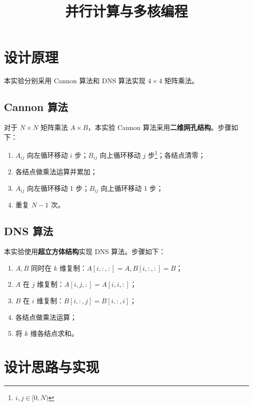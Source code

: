 \documentclass{zjureport-zh}
\title{并行计算与多核编程}
\begin{document}
\makecover


\section{设计原理}
\par 本实验分别采用 Cannon 算法和 DNS 算法实现 $4 \times 4$ 矩阵乘法。

\subsection{Cannon 算法} \label{cannon}
\par 对于 $N \times N$ 矩阵乘法 $A \times B$，本实验 Cannon 算法采用\textbf{二维网孔结构}。步骤如下：
\begin{enumerate}[label=\roman*), itemindent=2em]
	\item $A_{ij}$ 向左循环移动 $i$ 步；$B_{ij}$ 向上循环移动 $j$ 步\footnote{$i,j \in [0,N)$}；各结点清零； \label{cannon1}
	\item 各结点做乘法运算并累加；\label{cannon2}
	\item $A_{ij}$ 向左循环移动 1 步；$B_{ij}$ 向上循环移动 1 步；\label{cannon3}
	\item 重复 $N-1$ 次。
\end{enumerate}

\subsection{DNS 算法} \label{dns}
\par 本实验使用\textbf{超立方体结构}实现 DNS 算法。步骤如下：
\begin{enumerate}[label=\roman*), itemindent=2em]
	\item $A, B$ 同时在 $k$ 维复制：$A[i,:,:] = A, B[i,:,:] = B$；
	\item $A$ 在 $j$ 维复制：$A[i,j,:] = A[i,i,:]$；
	\item $B$ 在 $i$ 维复制：$B[i,:,j] = B[i,:,i]$；
	\item 各结点做乘法运算；
	\item 将 $k$ 维各结点求和。\label{dns_sum}
\end{enumerate}

\section{设计思路与实现}
\end{document}
